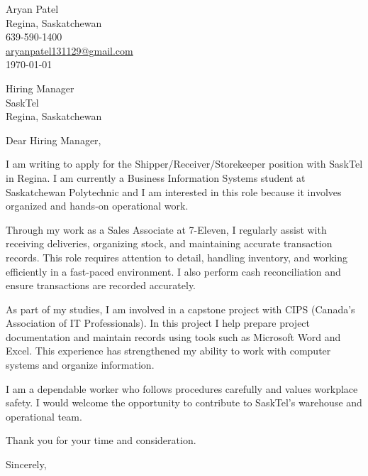\documentclass[letterpaper,12pt]{article}
\begin{document}

\begin{flushleft}
Aryan Patel \\
Regina, Saskatchewan \\
639-590-1400 \\
\href{mailto:aryanpatel131129@gmail.com}{aryanpatel131129@gmail.com} \\
\today
\end{flushleft}

\vspace{6mm}

\begin{flushleft}
Hiring Manager \\
SaskTel \\
Regina, Saskatchewan
\end{flushleft}

\vspace{4mm}

Dear Hiring Manager,

I am writing to apply for the Shipper/Receiver/Storekeeper position with SaskTel in Regina. I am currently a Business Information Systems student at Saskatchewan Polytechnic and I am interested in this role because it involves organized and hands-on operational work.

Through my work as a Sales Associate at 7-Eleven, I regularly assist with receiving deliveries, organizing stock, and maintaining accurate transaction records. This role requires attention to detail, handling inventory, and working efficiently in a fast-paced environment. I also perform cash reconciliation and ensure transactions are recorded accurately.

As part of my studies, I am involved in a capstone project with CIPS (Canada’s Association of IT Professionals). In this project I help prepare project documentation and maintain records using tools such as Microsoft Word and Excel. This experience has strengthened my ability to work with computer systems and organize information.

I am a dependable worker who follows procedures carefully and values workplace safety. I would welcome the opportunity to contribute to SaskTel’s warehouse and operational team.

Thank you for your time and consideration.

\vspace{6mm}

Sincerely, \\
\end{document}
